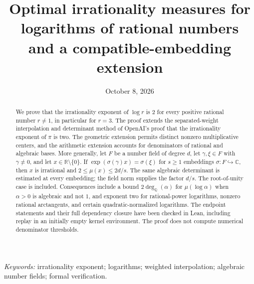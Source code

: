 \documentclass[11pt]{article}
\title{Optimal irrationality measures for logarithms of rational numbers\\
and a compatible-embedding extension}
\author{\PaperAuthor}
\date{October 8, 2026}
\theoremstyle{definition}
\theoremstyle{remark}
\numberwithin{equation}{section}
\newcommand{\R}{\mathbb R}
\newcommand{\Q}{\mathbb Q}
\newcommand{\C}{\mathbb C}
\begin{document}
\maketitle
\begin{abstract}
We prove that the irrationality exponent of \(\log r\) is \(2\) for every
positive rational number \(r\ne1\), in particular for \(r=3\).
The proof extends the separated-weight interpolation and determinant
method of OpenAI's proof that the irrationality exponent of \(\pi\) is two.
The geometric extension permits distinct nonzero multiplicative centers,
and the arithmetic extension accounts for denominators of rational and
algebraic bases. More generally, let \(F\) be a number field of degree
\(d\), let \(\gamma,\xi\in F\) with \(\gamma\ne0\), and let
\(x\in\R\setminus\{0\}\). If
\(\exp(\sigma(\gamma)x)=\sigma(\xi)\) for \(s\ge1\) embeddings
\(\sigma:F\hookrightarrow\C\), then \(x\) is irrational and
\(2\le\mu(x)\le2d/s\).
The same algebraic determinant is estimated at every embedding; the field
norm supplies the factor \(d/s\). The root-of-unity case is included.
Consequences include a bound \(2\deg_{\Q}(\alpha)\) for
\(\mu(\log\alpha)\) when \(\alpha>0\) is algebraic and not \(1\),
and exponent two for rational-power logarithms, nonzero rational
arctangents, and certain quadratic-normalized logarithms.
The endpoint statements and their full dependency closure have been
checked in Lean, including replay in an initially empty kernel
environment. The proof does not compute numerical denominator thresholds.
\end{abstract}
\noindent\textit{Keywords:} irrationality exponent; logarithms; weighted
interpolation; algebraic number fields; formal verification.

\tableofcontents









{\raggedright

}
\end{document}
